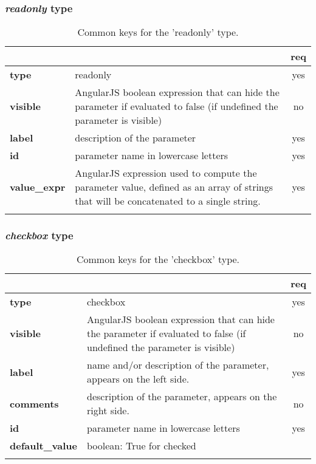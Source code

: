 \subsubsection{ \emph{readonly} type}

\begin{longtable}{|>{\bf}L{\linewidth}|L{\linewidth}|c|}
\hline
      &  & {\bf req} 
\tabularnewline \hline \hline
 type  & readonly    & yes \\ \hline
 visible  & AngularJS boolean expression that can hide the parameter if
            evaluated to false (if undefined the parameter is visible)& no \\ \hline
 label & description of the parameter & yes \\ \hline
 id         & parameter name in lowercase letters  & yes \\ \hline
 value\_expr & AngularJS expression used to compute the parameter value, defined as an
              array of strings that will be concatenated to a single string.
            & yes \\ \hline
\caption{Common keys for the 'readonly' type.}
\end{longtable}

\subsubsection{ \emph{checkbox} type}

\begin{longtable}{|>{\bf}L{\linewidth}|L{\linewidth}|c|}
\hline
      &  & {\bf req} 
\tabularnewline \hline \hline
 type  & checkbox  & yes \\ \hline
 visible  & AngularJS boolean expression that can hide the parameter if
            evaluated to false (if undefined the parameter is visible)& no \\ \hline
 label  & name and/or description of the parameter, appears on the left side. & yes
                      \\ \hline
 comments & description of the parameter, appears on the right side. & no
                      \\ \hline
 id         & parameter name in lowercase letters  & yes \\ \hline
 default\_value & boolean: True for checked & \\ \hline
\caption{Common keys for the 'checkbox' type.}
\end{longtable}

